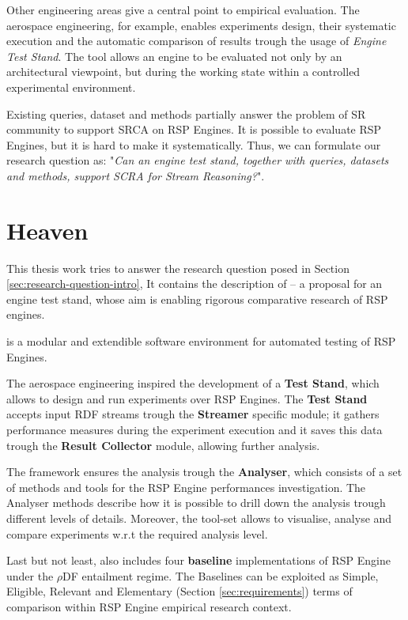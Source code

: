 Other engineering areas give a central point to empirical evaluation. The aerospace engineering, for example, enables experiments design, their systematic execution and the automatic comparison of results trough the usage of \textit{Engine Test Stand}. The tool allows an engine to be evaluated not only by an architectural viewpoint, but during the working state within a controlled experimental environment.

Existing queries, dataset and methods partially answer the problem of SR community to support SRCA on RSP Engines. It is possible to evaluate RSP Engines, but it is hard to make it systematically. Thus, we can formulate our research question as: "\textit{Can an engine test stand, together with queries, datasets and methods, support SCRA for Stream Reasoning?}".

\section{Heaven}\label{sec:heaven-intro}

This thesis work tries to answer the research question posed in Section \ref{sec:research-question-intro}, It contains the description of \name -- a proposal for an engine test stand,  whose aim is enabling rigorous comparative research of RSP engines. 

\name is a modular and extendible software environment for automated testing of RSP Engines. 

The aerospace engineering inspired the development of a \textbf{Test Stand}, which allows to design and run experiments over RSP Engines. The \textbf{Test Stand} accepts input RDF streams trough the \textbf{Streamer} specific module; it gathers performance measures during the experiment execution and it saves this data trough the \textbf{Result Collector} module, allowing further analysis.

The framework ensures the analysis trough the \textbf{Analyser}, which consists of a set of methods and tools for the RSP Engine performances investigation. The Analyser methods describe how it is possible to drill down the analysis trough different levels of details. Moreover, the tool-set allows to visualise, analyse and compare experiments w.r.t the required analysis level. 

Last but not least, \name also includes four \textbf{baseline} implementations of RSP Engine under the $\rho$DF \cite{DBLP:conf/esws/MunozPG07} entailment regime. The Baselines can be exploited  as Simple, Eligible, Relevant and Elementary (Section \ref{sec:requirements}) terms of comparison within RSP Engine empirical research context.  

